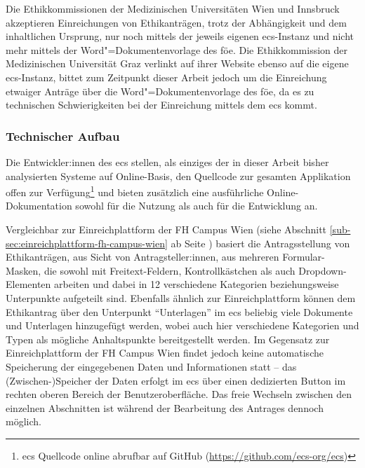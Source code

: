 \documentclass[a4paper,12pt,twoside]{scrreprt}
\begin{document}
Die Ethikkommissionen der Medizinischen Universitäten Wien und Innsbruck akzeptieren Einreichungen von Ethikanträgen, trotz der Abhängigkeit und dem inhaltlichen Ursprung, nur noch mittels der jeweils eigenen \ac{ecs}-Instanz und nicht mehr mittels der Word"=Dokumentenvorlage des \ac{föe}. \cite{ethikkommission_der_medizinischen_universitat_wien_ethik_2023, medizinische_universitat_innsbruck_einreichungen_2023} Die Ethikkommission der Medizinischen Universität Graz verlinkt auf ihrer Website ebenso auf die eigene \ac{ecs}-Instanz, bittet zum Zeitpunkt dieser Arbeit jedoch um die Einreichung etwaiger Anträge über die Word"=Dokumentenvorlage des \ac{föe}, da es zu technischen Schwierigkeiten bei der Einreichung mittels dem \ac{ecs} kommt. \cite{medizinische_universitat_graz_ethikkommission_2023}

\subsubsection*{Technischer Aufbau}
\label{sub-sub-sec:ecs-technischer-aufbau}

Die Entwickler:innen des \acl{ecs} stellen, als einziges der in dieser Arbeit bisher analysierten Systeme auf Online-Basis, den Quellcode zur gesamten Applikation offen zur Verfügung\footnote{\ac{ecs} Quellcode online abrufbar auf GitHub (\url{https://github.com/ecs-org/ecs})} und bieten zusätzlich eine ausführliche Online-Dokumentation sowohl für die Nutzung als auch für die Entwicklung an. \cite{medizinische_universitat_wien_ecs-docs_about-2021, medizinische_universitat_wien_development_2021, medizinische_universitat_wien_installationusage_2021}

\medskip

Vergleichbar zur Einreichplattform der FH Campus Wien (siehe Abschnitt \ref{sub-sec:einreichplattform-fh-campus-wien} ab Seite \pageref{sub-sec:einreichplattform-fh-campus-wien}) basiert die Antragsstellung von Ethikanträgen, aus Sicht von Antragsteller:innen, aus mehreren Formular-Masken, die sowohl mit Freitext-Feldern, Kontrollkästchen als auch Dropdown-Elementen arbeiten und dabei in 12 verschiedene Kategorien beziehungsweise Unterpunkte aufgeteilt sind. Ebenfalls ähnlich zur Einreichplattform können dem Ethikantrag über den Unterpunkt \enquote{Unterlagen} im \ac{ecs} beliebig viele Dokumente und Unterlagen hinzugefügt werden, wobei auch hier verschiedene Kategorien und Typen als mögliche Anhaltspunkte bereitgestellt werden. Im Gegensatz zur Einreichplattform der FH Campus Wien findet jedoch keine automatische Speicherung der eingegebenen Daten und Informationen statt -- das (Zwischen-)Speicher der Daten erfolgt im \ac{ecs} über einen dedizierten Button im rechten oberen Bereich der Benutzeroberfläche. Das freie Wechseln zwischen den einzelnen Abschnitten ist während der Bearbeitung des Antrages dennoch möglich.
\end{document}
